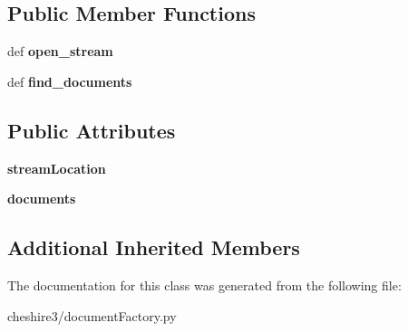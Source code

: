\subsection*{Public Member Functions}
\begin{DoxyCompactItemize}
\item 
\hypertarget{classcheshire3_1_1document_factory_1_1_term_hash_document_stream_a92f185be1e800a693052e91f067f400f}{def {\bfseries open\-\_\-stream}}\label{classcheshire3_1_1document_factory_1_1_term_hash_document_stream_a92f185be1e800a693052e91f067f400f}

\item 
\hypertarget{classcheshire3_1_1document_factory_1_1_term_hash_document_stream_a361849a4ee8743d81803aec8a96d6a44}{def {\bfseries find\-\_\-documents}}\label{classcheshire3_1_1document_factory_1_1_term_hash_document_stream_a361849a4ee8743d81803aec8a96d6a44}

\end{DoxyCompactItemize}
\subsection*{Public Attributes}
\begin{DoxyCompactItemize}
\item 
\hypertarget{classcheshire3_1_1document_factory_1_1_term_hash_document_stream_a48873e23b899afb4ed4903cd6d0000c8}{{\bfseries stream\-Location}}\label{classcheshire3_1_1document_factory_1_1_term_hash_document_stream_a48873e23b899afb4ed4903cd6d0000c8}

\item 
\hypertarget{classcheshire3_1_1document_factory_1_1_term_hash_document_stream_a73dcf088c3886edde36e89f2af3b7be5}{{\bfseries documents}}\label{classcheshire3_1_1document_factory_1_1_term_hash_document_stream_a73dcf088c3886edde36e89f2af3b7be5}

\end{DoxyCompactItemize}
\subsection*{Additional Inherited Members}


The documentation for this class was generated from the following file\-:\begin{DoxyCompactItemize}
\item 
cheshire3/document\-Factory.\-py\end{DoxyCompactItemize}
